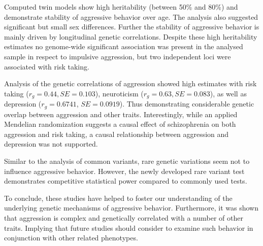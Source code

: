 \documentclass[header.tex]{subfiles}
\begin{document}
Computed twin models show high heritability (between 50\% and 80\%) and demonstrate stability of aggressive behavior over age.
The analysis also suggested significant but small sex differences.
Further the stability of aggressive behavior is mainly driven by longitudinal genetic correlations.
Despite these high heritability estimates no genome-wide significant association was present in the analysed sample in respect to impulsive aggression, but two independent loci were associated with risk taking.

Analysis of the genetic correlations of aggression showed high estimates with risk taking ($r_g=0.44, SE=0.103$), neuroticism ($r_g=0.63, SE=0.083$), as well as depression ($r_g=0.6741$, $SE=0.0919$).
Thus demonstrating considerable genetic overlap between aggression and other traits.
Interestingly, while an applied Mendelian randomization suggests a causal effect of schizophrenia on both aggression and risk taking, a causal relationship between aggression and depression was not supported.

Similar to the analysis of common variants, rare genetic variations seem not to influence aggressive behavior.
However, the newly developed rare variant test demonstrates competitive statistical power compared to commonly used tests.

To conclude, these studies have helped to foster our understanding of the underlying genetic mechanisms of aggressive behavior.
Furthermore, it was shown that aggression is complex and genetically correlated with a number of other traits.
Implying that future studies should consider to examine such behavior in conjunction with other related phenotypes.     
\end{document}
